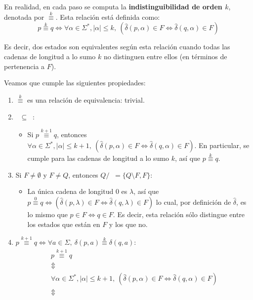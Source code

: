 En realidad, en cada paso se computa la \textbf{indistinguibilidad de orden $k$}, denotada por $\overset{k}{\equiv}$. Esta relación está definida como:
$$
    p \overset{k}{\equiv} q \iff \forall \alpha \in \Sigma^*, |\alpha| \leq k,\ (\hat\delta(p, \alpha) \in F \iff \hat\delta(q, \alpha) \in F)
$$

Es decir, dos estados son equivalentes según esta relación cuando todas las cadenas de longitud a lo sumo $k$ no distinguen entre ellos (en términos de pertenencia a $F$).

Veamos que cumple las siguientes propiedades:
\begin{enumerate}
    \item $\overset{k}{\equiv}$ es una relación de equivalencia: trivial.
    \item $\mathop{\overset{k + 1}{\equiv}} \subseteq \mathop{\overset{k}{\equiv}}$:
          \begin{itemize}
              \item Si $p \overset{k + 1}{\equiv} q$, entonces $\forall \alpha \in \Sigma^*, |\alpha| \leq k + 1,\ (\hat\delta(p, \alpha) \in F \iff \hat\delta(q, \alpha) \in F)$. En particular, se cumple para las cadenas de longitud a lo sumo $k$, así que $p \overset{k}{\equiv} q$.
          \end{itemize}
    \item Si $F \neq \emptyset$ y $F \neq Q$, entonces $Q / \mathop{\overset{0}{\equiv}} = \{Q \setminus F, F\}$:
          \begin{itemize}
              \item La única cadena de longitud $0$ es $\lambda$, así que $p \overset{0}{\equiv} q \iff (\hat\delta(p, \lambda) \in F \iff \hat\delta(q, \lambda) \in F)$ lo cual, por definición de $\hat\delta$, es lo mismo que $p \in F \iff q \in F$. Es decir, esta relación sólo distingue entre los estados que están en $F$ y los que no.
          \end{itemize}
    \item $p \overset{k + 1}{\equiv} q \iff \forall a \in \Sigma,\ \delta(p, a) \overset{k}{\equiv} \delta(q, a)$:
          \begin{gather*}
              p \overset{k + 1}{\equiv} q \\
              \Updownarrow \\
              \forall \alpha \in \Sigma^*, |\alpha| \leq k + 1,\ (\hat\delta(p, \alpha) \in F \iff \hat\delta(q, \alpha) \in F) \\
              \Updownarrow \\

\end{gather*}
\end{enumerate}

